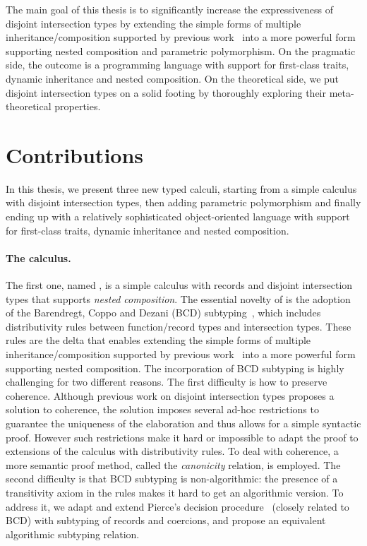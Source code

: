 The main goal of this thesis is to significantly increase the expressiveness of
disjoint intersection types by extending the simple forms of multiple
inheritance/composition supported by previous work~\citep{alpuimdisjoint, oliveira2016disjoint}
into a more powerful form supporting nested composition
and parametric polymorphism. On the pragmatic side, the outcome is a programming
language with support for first-class traits, dynamic inheritance and nested
composition. On the theoretical side, we put disjoint intersection types on a
solid footing by thoroughly exploring their meta-theoretical properties.


\section{Contributions}

In this thesis, we present three new typed calculi, starting from a simple
calculus with disjoint intersection types, then adding parametric polymorphism
and finally ending up with a relatively sophisticated object-oriented language
with support for first-class traits, dynamic inheritance and nested composition.

\paragraph{The \namee calculus.}

The first one, named \namee, is a simple calculus with records and disjoint
intersection types that supports \emph{nested composition}. The essential
novelty of \namee is the adoption of the
Barendregt, Coppo and Dezani (BCD) subtyping~\citep{Barendregt_1983}, which includes distributivity
rules between function/record types and intersection types. These rules are the
delta that enables extending the simple forms of multiple inheritance/composition
supported by previous work~\citep{oliveira2016disjoint} into a more powerful form
supporting nested composition. The incorporation of BCD subtyping is highly
challenging for two different reasons. The first difficulty is how to preserve
coherence. Although previous work on disjoint intersection types proposes a
solution to coherence, the solution imposes several ad-hoc restrictions to
guarantee the uniqueness of the elaboration and thus allows for a simple
syntactic proof. However such restrictions make it hard or
impossible to adapt the proof to extensions of the calculus with distributivity
rules. To deal with coherence, a more semantic proof method, called the \emph{canonicity} relation, is employed.
The second difficulty is that BCD subtyping is non-algorithmic: the presence of a transitivity axiom in the
rules makes it hard to get an algorithmic version. To address it, we adapt and extend
Pierce's decision procedure~\citep{pierce1989decision} (closely related to BCD)
with subtyping of records and coercions, and propose an equivalent algorithmic
subtyping relation.

